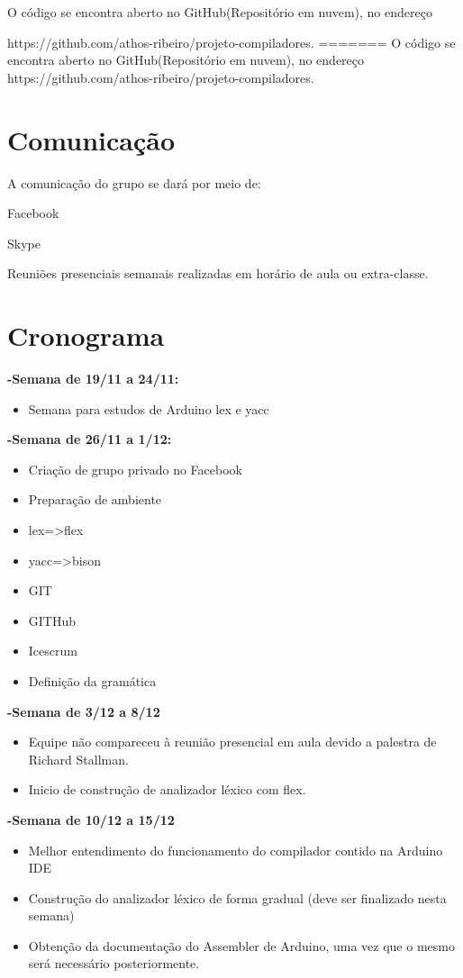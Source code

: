 \documentclass{abnt}
\begin{document}
O código se encontra aberto no GitHub(Repositório em nuvem), no endereço

 https://github.com/athos-ribeiro/projeto-compiladores.
=======
O código se encontra aberto no GitHub(Repositório em nuvem), no endereço https://github.com/athos-ribeiro/projeto-compiladores.

\section{Comunicação}
    A comunicação do grupo se dará por meio de:

    Facebook

    Skype

    Reuniões presenciais semanais realizadas em horário de aula ou extra-classe.

\section{Cronograma}
        \textbf{-Semana de 19/11 a 24/11:}
            \begin{itemize}
                \item Semana para estudos de Arduino lex e yacc
            \end{itemize}
         \textbf{-Semana de 26/11 a 1/12:}
         \begin{itemize}
             \item Criação de grupo privado no Facebook
\item Preparação de ambiente
\item lex=>flex
\item yacc=>bison
\item GIT
\item GITHub
\item Icescrum
\item Definição da gramática
    \end{itemize}
    \textbf{-Semana de 3/12 a 8/12}
         \begin{itemize}
             \item Equipe não compareceu à reunião presencial em aula devido a palestra de Richard Stallman.
             \item Inicio de construção de analizador léxico com flex.
    \end{itemize}
    \textbf{-Semana de 10/12 a 15/12}
         \begin{itemize}
             \item Melhor entendimento do funcionamento do compilador contido na Arduino IDE
             \item Construção do analizador léxico de forma gradual (deve ser finalizado nesta semana)
             \item Obtenção da documentação do Assembler de Arduino, uma vez que o mesmo será necessário posteriormente.
    \end{itemize}
\end{document}
